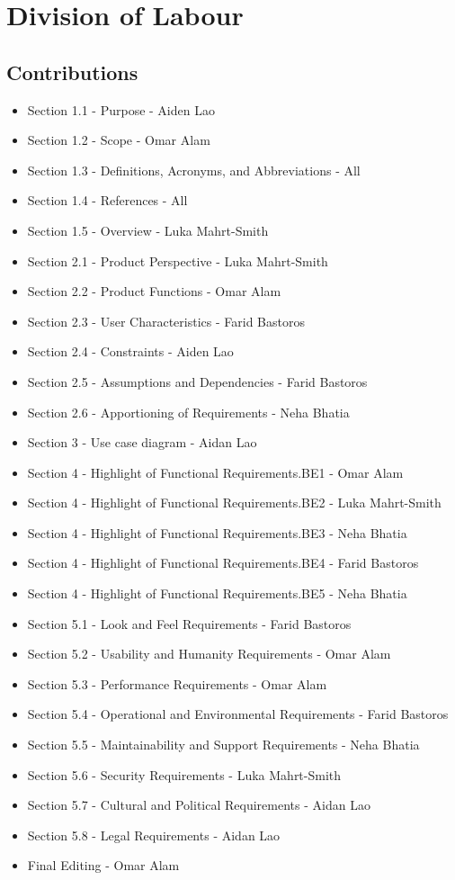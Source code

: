 \documentclass[]{article}
\begin{document}


\appendix
\section{Division of Labour}
\label{sec:division_of_labour}

\subsection{Contributions}


\begin{itemize}
	\item Section 1.1 - Purpose - Aiden Lao
	\item Section 1.2 - Scope - Omar Alam
	\item Section 1.3 - Definitions, Acronyms, and Abbreviations - All
	\item Section 1.4 - References - All
	\item Section 1.5 - Overview - Luka Mahrt-Smith
	\item Section 2.1 - Product Perspective - Luka Mahrt-Smith
	\item Section 2.2 - Product Functions - Omar Alam
	\item Section 2.3 - User Characteristics - Farid Bastoros
	\item Section 2.4 - Constraints - Aiden Lao
	\item Section 2.5 - Assumptions and Dependencies - Farid Bastoros
	\item Section 2.6 - Apportioning of Requirements - Neha Bhatia
	\item Section 3 - Use case diagram - Aidan Lao
	\item Section 4 - Highlight of Functional Requirements.BE1 - Omar Alam
	\item Section 4 - Highlight of Functional Requirements.BE2 - Luka Mahrt-Smith
	\item Section 4 - Highlight of Functional Requirements.BE3 - Neha Bhatia
	\item Section 4 - Highlight of Functional Requirements.BE4 - Farid Bastoros
	\item Section 4 - Highlight of Functional Requirements.BE5 - Neha Bhatia
	\item Section 5.1 - Look and Feel Requirements - Farid Bastoros
	\item Section 5.2 - Usability and Humanity Requirements - Omar Alam
	\item Section 5.3 - Performance Requirements - Omar Alam
	\item Section 5.4 - Operational and Environmental Requirements - Farid Bastoros
	\item Section 5.5 - Maintainability and Support Requirements - Neha Bhatia
	\item Section 5.6 - Security Requirements - Luka Mahrt-Smith
	\item Section 5.7 - Cultural and Political Requirements - Aidan Lao
	\item Section 5.8 - Legal Requirements - Aidan Lao
	\item Final Editing - Omar Alam
\end{itemize}
\end{document}
